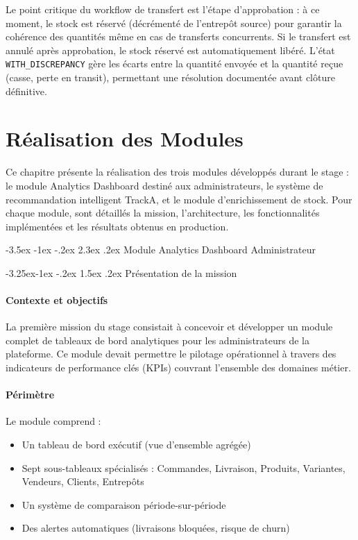 \documentclass[12pt,a4paper,openany]{report}
\makeatletter
\renewcommand\section{\@startsection{section}{1}{\z@}%
  {-3.5ex \@plus -1ex \@minus -.2ex}%
  {2.3ex \@plus.2ex}%
  {\needspace{10\baselineskip}\normalfont\Large\bfseries\color{primary}}}
\renewcommand\subsection{\@startsection{subsection}{2}{\z@}%
  {-3.25ex\@plus -1ex \@minus -.2ex}%
  {1.5ex \@plus .2ex}%
  {\needspace{8\baselineskip}\normalfont\large\bfseries\color{primary!80!black}}}
\newcommand{\code}[1]{\texttt{#1}}
\makeatother
\begin{document}
Le point critique du workflow de transfert est l'étape d'approbation : à ce moment, le stock est réservé (décrémenté de l'entrepôt source) pour garantir la cohérence des quantités même en cas de transferts concurrents. Si le transfert est annulé après approbation, le stock réservé est automatiquement libéré. L'état \code{WITH\_DISCREPANCY} gère les écarts entre la quantité envoyée et la quantité reçue (casse, perte en transit), permettant une résolution documentée avant clôture définitive.


\chapter[Réalisation des Modules]{Réalisation des Modules}

Ce chapitre présente la réalisation des trois modules développés durant le stage : le module Analytics Dashboard destiné aux administrateurs, le système de recommandation intelligent TrackA, et le module d'enrichissement de stock. Pour chaque module, sont détaillés la mission, l'architecture, les fonctionnalités implémentées et les résultats obtenus en production.

\section{Module Analytics Dashboard Administrateur}

\subsection{Présentation de la mission}

\subsubsection{Contexte et objectifs}

La première mission du stage consistait à concevoir et développer un module complet de tableaux de bord analytiques pour les administrateurs de la plateforme. Ce module devait permettre le pilotage opérationnel à travers des indicateurs de performance clés (KPIs) couvrant l'ensemble des domaines métier.

\subsubsection{Périmètre}

Le module comprend :
\begin{itemize}
  \item Un tableau de bord exécutif (vue d'ensemble agrégée)
  \item Sept sous-tableaux spécialisés : Commandes, Livraison, Produits, Variantes, Vendeurs, Clients, Entrepôts
  \item Un système de comparaison période-sur-période
  \item Des alertes automatiques (livraisons bloquées, risque de churn)
\end{itemize}
\end{document}
